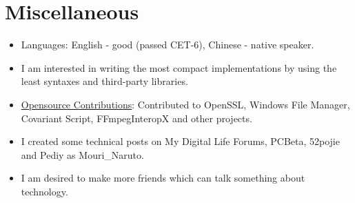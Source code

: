 \documentclass{resume}
\begin{document}
\section{Miscellaneous}
\begin{itemize}

  \item Languages: English - good (passed CET-6),  Chinese - native speaker.

  \item I am interested in writing the most compact implementations by using the least syntaxes and third-party libraries.

  \item \href{https://github.com/search?q=is%3Apr+author%3AMouriNaruto&type=Issues}{Opensource Contributions}: Contributed to OpenSSL, Windows File Manager, Covariant Script, FFmpegInteropX and other projects.
  
  \item I created some technical posts on My Digital Life Forums, PCBeta, 52pojie and Pediy as Mouri\_Naruto.
  
  \item I am desired to make more friends which can talk something about technology.
  
\end{itemize}
\end{document}
